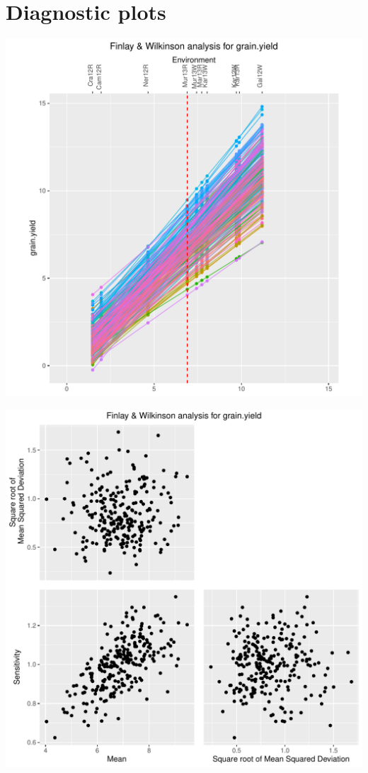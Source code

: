 \documentclass[a4paper,11pt]{article}\usepackage[]{graphicx}\usepackage[]{xcolor}
\newenvironment{knitrout}{}{} %
\begin{document}
\clearpage
\section{Diagnostic plots}
\begin{knitrout}
\color{fgcolor}

\includegraphics[width=0.9\linewidth]{./figures/112423080916-linePlot-1} \hfill{}


\end{knitrout}
\clearpage
\begin{knitrout}
\color{fgcolor}
\includegraphics[width=0.9\linewidth]{./figures/112423080916-scatterPlot-1} 
\end{knitrout}
\clearpage
\end{document}
